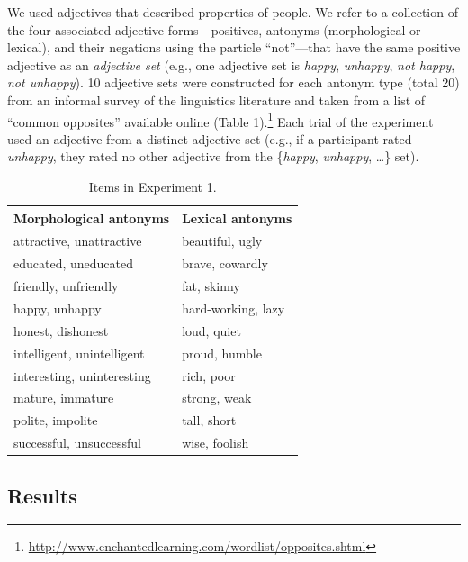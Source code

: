 \documentclass[floatsintext,doc]{apa6}
\let\rmarkdownfootnote\footnote%
\def\footnote{\protect\rmarkdownfootnote}
\begin{document}
We used adjectives that described properties of people.
We refer to a collection of the four associated adjective forms---positives, antonyms (morphological or lexical), and their negations using the particle \enquote{not}---that have the same positive adjective as an \emph{adjective set} (e.g., one adjective set is \emph{happy}, \emph{unhappy}, \emph{not happy}, \emph{not unhappy}).
10 adjective sets were constructed for each antonym type (total 20) from an informal survey of the linguistics literature and taken from a list of \enquote{common opposites} available online (Table 1).\footnote{\url{http://www.enchantedlearning.com/wordlist/opposites.shtml}}
Each trial of the experiment used an adjective from a distinct adjective set (e.g., if a participant rated \emph{unhappy}, they rated no other adjective from the \{\emph{happy}, \emph{unhappy}, \ldots{}\} set).

\begin{table}[h]
\centering
\begingroup\fontsize{10pt}{11pt}\selectfont
\begin{tabular}{ll}
  \hline
Morphological antonyms & Lexical antonyms \\ 
  \hline
attractive, unattractive & beautiful, ugly \\ 
  educated, uneducated & brave, cowardly \\ 
  friendly, unfriendly & fat, skinny \\ 
  happy, unhappy & hard-working, lazy \\ 
  honest, dishonest & loud, quiet \\ 
  intelligent, unintelligent & proud, humble \\ 
  interesting, uninteresting & rich, poor \\ 
  mature, immature & strong, weak \\ 
  polite, impolite & tall, short \\ 
  successful, unsuccessful & wise, foolish \\ 
   \hline
\end{tabular}
\endgroup
\caption{Items in Experiment 1.} 
\end{table}

\subsection{Results}\label{results}%
\end{document}

